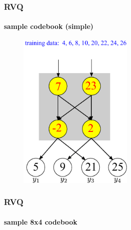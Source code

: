 \begin{frame}
\frametitle{RVQ}
\framesubtitle{sample codebook (simple)}
\mypagenum{}
\begin{figure}[t]
\centering
\includegraphics[width=0.5\textwidth]{figs/RVQ_introduction.pdf}
\end{figure}
\end{frame}


\begin{frame}
\frametitle{RVQ}
\framesubtitle{sample 8x4 codebook}
\logoCSIPCPL\mypagenum
\setcounter{subfigure}{0}
\begin{figure}[h!]
\centering{}
\end{figure}
\end{frame}



